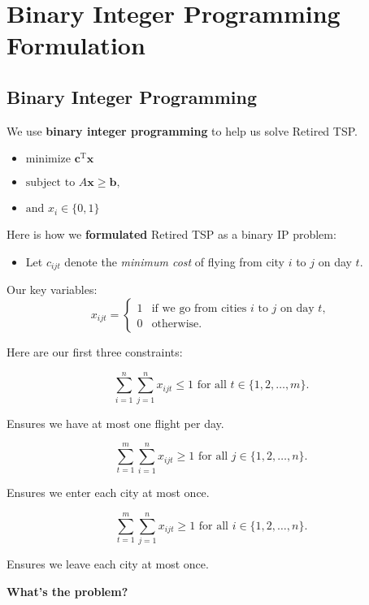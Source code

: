 \documentclass[10pt, xcolor=svgnames]{beamer}
\begin{document}
\section{Binary Integer Programming Formulation}

\subsection{Binary Integer Programming}

\begin{frame}
We use \textbf{binary integer programming} to help us solve Retired TSP.

\begin{itemize}
    \item $\text{minimize }   \mathbf{c}^\mathrm{T} \mathbf{x} $
    \item $\text{subject to } A \mathbf{x} \ge \mathbf{b},$
    \item $\text{and } x_i \in \{0,1\}$
\end{itemize}

\pause
Here is how we \textbf{formulated} Retired TSP as a binary IP problem:

\begin{itemize}
    \item Let $c_{ijt}$ denote the \emph{minimum cost} of flying from city $i$ to $j$ on day $t$.
\end{itemize}
Our key variables:
\[
x_{ijt} = \begin{cases}
1 &\mbox{if we go from cities } i \mbox{ to } j \mbox{ on day } t, \\ 
0 & \mbox{otherwise}.
\end{cases}
\]
\end{frame}

\begin{frame}
Here are our first three constraints:

\begin{equation}
\sum_{i=1}^{n} \sum_{j=1}^{n} x_{ijt} \le 1 \mbox{ for all } t \in \{1, 2, \ldots, m\}.
\end{equation}

Ensures we have at most one flight per day.

\pause
\begin{equation}
\sum_{t=1}^{m} \sum_{i=1}^{n} x_{ijt} \ge 1 \mbox{ for all } j \in \{1, 2, \ldots, n\}.
\end{equation}

Ensures we enter each city at most once.

\pause
\begin{equation}
\sum_{t=1}^{m} \sum_{j=1}^{n} x_{ijt} \ge 1 \mbox{ for all } i \in \{1, 2, \ldots, n\}.
\end{equation}

Ensures we leave each city at most once.\\
\pause

\textbf{What's the problem?}
\end{frame}
\end{document}
